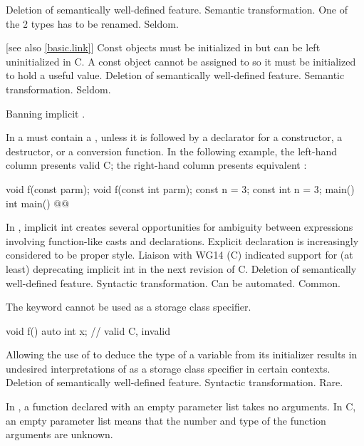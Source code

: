 \effect
Deletion of semantically well-defined feature.
\difficulty
Semantic transformation.
One of the 2 types has to be renamed.
\howwide
Seldom.

 [see also \ref{basic.link}]
\change
Const objects must be initialized in \Cpp{} but can be left uninitialized in C.
\rationale
A const object cannot be assigned to so it must be initialized
to hold a useful value.
\effect
Deletion of semantically well-defined feature.
\difficulty
Semantic transformation.
\howwide
Seldom.

\change
Banning implicit .

In \Cpp{} a
must contain a
, unless
it is followed by a declarator for a constructor, a destructor, or a
conversion function.
In the following example, the
left-hand column presents valid C;
the right-hand column presents
equivalent \Cpp{}:
\begin{codeblock}
void f(const parm);            void f(const int parm);
const n = 3;                   const int n = 3;
main()                         int main()
    @\commentellip@                      @\commentellip@
\end{codeblock}

\rationale
In \Cpp{}, implicit int creates several opportunities for
ambiguity between expressions involving function-like
casts and declarations.
Explicit declaration is increasingly considered
to be proper style.
Liaison with WG14 (C) indicated support for (at least)
deprecating implicit int in the next revision of C.
\effect
Deletion of semantically well-defined feature.
\difficulty
Syntactic transformation.
Can be automated.
\howwide
Common.

\change
The keyword  cannot be used as a storage class specifier.

\begin{codeblock}
void f() {
  auto int x;       // valid C, invalid \Cpp{}
}
\end{codeblock}

\rationale
Allowing the use of  to deduce the type
of a variable from its initializer results in undesired interpretations of
 as a storage class specifier in certain contexts.
\effect
Deletion of semantically well-defined feature.
\difficulty
Syntactic transformation.
\howwide
Rare.

\change
In \Cpp{}, a function declared with an empty parameter list takes no arguments.
In C, an empty parameter list means that the number and type of the function arguments are unknown.

